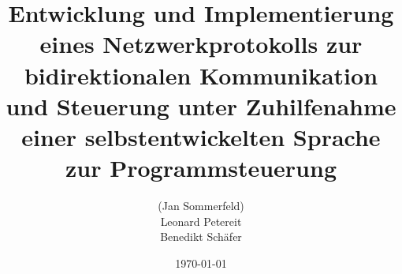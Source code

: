 \documentclass[12pt,a4paper]{scrartcl}
\begin{document}
\title{Entwicklung und Implementierung eines Netzwerkprotokolls zur bidirektionalen Kommunikation und Steuerung unter Zuhilfenahme einer selbstentwickelten Sprache zur Programmsteuerung}
\date{\today}
\author{(Jan Sommerfeld)\\ Leonard Petereit\\ Benedikt Schäfer}
\maketitle
\tableofcontents

\newpage



\newpage


\newpage



\newpage

\end{document}
